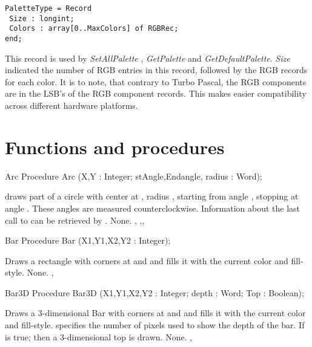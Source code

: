 \begin{verbatim}
PaletteType = Record
 Size : longint;
 Colors : array[0..MaxColors] of RGBRec;
end;
\end{verbatim}

This record is used by \textit{SetAllPalette} , \textit{GetPalette} and
\textit{GetDefaultPalette}. \textit{Size} indicated the number of RGB
entries in this record, followed by the RGB records for each color. It
is to note, that contrary to Turbo Pascal, the RGB components are in
the LSB's of the RGB component records. This makes easier compatibility
across different hardware platforms.


\section{Functions and procedures}


\begin{procedure}{Arc}
\Declaration
Procedure Arc (X,Y : Integer; stAngle,Endangle, radius : Word);

\Description
  draws part of a circle with center at , radius
, starting from angle , stopping at angle .
These  angles are measured counterclockwise. Information about the last call
to  can be retrieved by .
\Errors
None.
\SeeAlso
{},
,, 
\end{procedure}

\begin{procedure}{Bar}
\Declaration
Procedure Bar (X1,Y1,X2,Y2 : Integer);

\Description
Draws a rectangle with corners at  and 
and fills it with the current color and fill-style.
\Errors
None.
\SeeAlso
{},
\end{procedure}

\begin{procedure}{Bar3D}
\Declaration
Procedure Bar3D (X1,Y1,X2,Y2 : Integer; depth : Word; Top : Boolean);

\Description
Draws a 3-dimensional Bar  with corners at  and 
and fills it with the current color and fill-style.
 specifies the number of pixels used to show the depth of the
bar.
If  is true; then a 3-dimensional top is drawn.
\Errors
None.
\SeeAlso
{}, 
\end{procedure}

